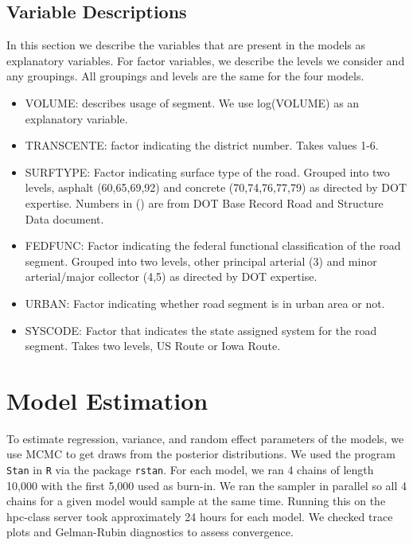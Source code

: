 \documentclass[a4paper]{article}\usepackage[]{graphicx}\usepackage[]{color}
\begin{document}
\subsection{Variable Descriptions}
In this section we describe the variables that are present in the models as explanatory variables. For factor variables, we describe the levels we consider and any groupings. All groupings and levels are the same for the four models.

\begin{itemize}
\item
VOLUME: describes usage of segment. We use log(VOLUME) as an explanatory variable.

\item
TRANSCENTE: factor indicating the district number. Takes values 1-6.

\item
SURFTYPE: Factor indicating surface type of the road. Grouped into two levels, asphalt (60,65,69,92) and concrete (70,74,76,77,79) as directed by DOT expertise. Numbers in () are from DOT Base Record Road and Structure Data document.

\item
FEDFUNC: Factor indicating the federal functional classification of the road segment. Grouped into two levels, other principal arterial (3) and minor arterial/major collector (4,5) as directed by DOT expertise.

\item
URBAN: Factor indicating whether road segment is in urban area or not.

\item
SYSCODE: Factor that indicates the state assigned system for the road segment. Takes two levels, US Route or Iowa Route.

\end{itemize}

\section{Model Estimation}
To estimate regression, variance, and random effect parameters of the models, we use MCMC to get draws from the posterior distributions. We used the program \texttt{Stan} in \texttt{R} via the package \texttt{rstan}. For each model, we ran 4 chains of length 10,000 with the first 5,000 used as burn-in. We ran the sampler in parallel so all 4 chains for a given model would sample at the same time. Running this on the hpc-class server took approximately 24 hours for each model. We checked trace plots and Gelman-Rubin diagnostics to assess convergence. 
\end{document}
